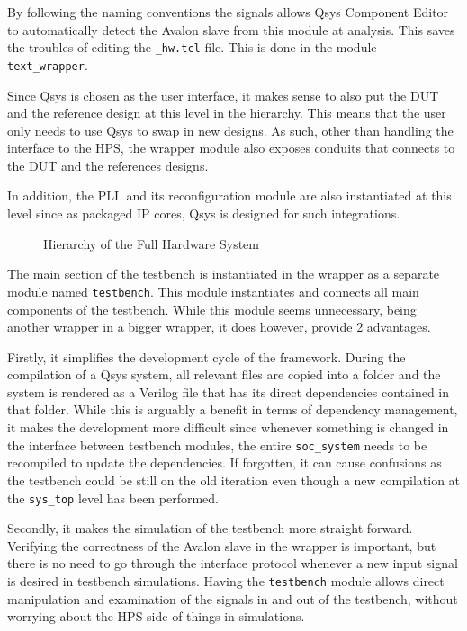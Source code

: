 By following the naming conventions  the signals allows Qsys Component Editor to automatically detect the Avalon slave from this module at analysis.
This saves the troubles of editing the \texttt{\_hw.tcl} file.
This is done in the module \texttt{text\_wrapper}.

Since Qsys is chosen as the user interface, it makes sense to also put the DUT and the reference design at this level in the hierarchy.
This means that the user only needs to use Qsys to swap in new designs.
As such, other than handling the interface to the HPS, the wrapper module also exposes conduits that connects to the DUT and the references designs.

In addition, the PLL and its reconfiguration module are also instantiated at this level since as packaged IP cores, Qsys is designed for such integrations.

\begin{figure}[H]
  \centering
  
  \caption{Hierarchy of the Full Hardware System}
  \label{Hierarchy}
\end{figure}

The main section of the testbench is instantiated in the wrapper as a separate module named \texttt{testbench}.
This module instantiates and connects all main components of the testbench.
While this module seems unnecessary, being another wrapper in a bigger wrapper, it does however, provide 2 advantages.

Firstly, it simplifies the development cycle of the framework.
During the compilation of a Qsys system, all relevant files are copied into a folder and the system is rendered as a Verilog file that has its direct dependencies contained in that folder.
While this is arguably a benefit in terms of dependency management, it makes the development more difficult since whenever something is changed in the interface between testbench modules, the entire \texttt{soc\_system} needs to be recompiled to update the dependencies.
If forgotten, it can cause confusions as the testbench could be still on the old iteration even though a new compilation at the \texttt{sys\_top} level has been performed.

Secondly, it makes the simulation of the testbench more straight forward.
Verifying the correctness of the Avalon slave in the wrapper is important, but there is no need to go through the interface protocol whenever a new input signal is desired in testbench simulations.
Having the \texttt{testbench} module allows direct manipulation and examination of the signals in and out of the testbench, without worrying about the HPS side of things in simulations.
